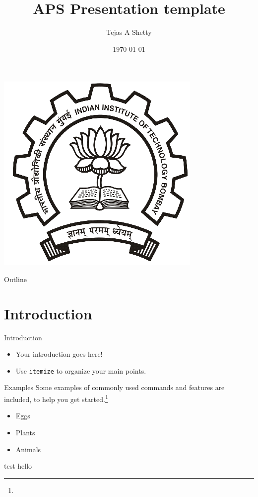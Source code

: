 \documentclass{beamer}
\title[main_aps_template]{APS  Presentation template}
\author{Tejas A Shetty}
\institute{IIT Bombay}
\date{\today}
\begin{document}

\begin{frame}
  \titlepage
\begin{center}
  \includegraphics[scale=0.2]{IITB_logo.png}  \\
\end{center}
\end{frame}



\begin{frame}{Outline}
  \tableofcontents
\end{frame}

\section{Introduction}

\begin{frame}{Introduction}

\begin{itemize}
  \item Your introduction goes here!
  \item Use \texttt{itemize} to organize your main points.
\end{itemize}

\vskip 1cm

\begin{block}{Examples}
Some examples of commonly used commands and features are included, to help you get started.\footnote{}
\end{block}

\end{frame}
\begin{frame}


\begin{itemize}
  \item<1-> Eggs
  \item<2-> Plants
  \item<3-> Animals
\end{itemize}

\end{frame}
\begin{frame}{test}
hello
\end{frame}
\end{document}
